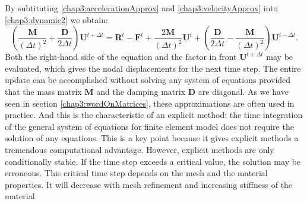By subtituting \eqref{chap3:accelerationApprox} and \eqref{chap3:velocityApprox} into \eqref{chap3:dynamic2} we obtain:
\begin{equation}
\label{chap3:relationCDM}
\left( \dfrac{\mathbf{M}}{(\Delta t)^2} + \dfrac{\mathbf{D}}{2 \Delta t} \right) \mathbf{U}^{t+\Delta t} = \mathbf{R}^t - \mathbf{F}^t + \dfrac{2 \mathbf{M}}{(\Delta t)^2} \mathbf{U}^t + \left( \dfrac{\mathbf{D}}{2 \Delta t} - \dfrac{\mathbf{M}}{(\Delta t)^2} \right) \mathbf{U}^{t-\Delta t}.
\end{equation}
Both the right-hand side of the equation and the factor in front $ \mathbf{U}^{t+\Delta t} $ may be evaluated, which gives the nodal displacements for the next time step. The entire update can be accomplished without solving any system of equations provided that the mass matrix $ \mathbf{M} $ and the damping matrix $ \mathbf{D} $ are diagonal. As we have seen in section \ref{chap3:wordOnMatrices}, these approximations are often used in practice. And this is the characteristic of an explicit method: the time integration of the general system of equations for finite element model does not require the solution of any equations. This is a key point because it gives explicit methods a tremendous computational advantage. However, explicit methods are only conditionally stable. If the time step exceeds a critical value, the solution may be erroneous. This critical time step depends on the mesh and the material properties. It will decrease with mesh refinement and increasing stiffness of the material. 


